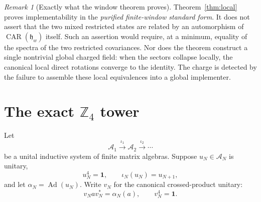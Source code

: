 \documentclass[11pt]{article}
\theoremstyle{remark}
\newtheorem{remark}[theorem]{Remark}
\newcommand{\CAR}{\operatorname{CAR}}
\newcommand{\id}{\mathbf 1}
\newcommand{\A}{\mathcal A}
\begin{document}
\begin{remark}[Exactly what the window theorem proves]
Theorem~\ref{thm:local} proves implementability in the
\emph{purified finite-window standard form}.  It does not assert that the
two mixed restricted states are related by an automorphism of
$\CAR(\mathfrak h_w)$ itself.  Such an assertion would require, at a
minimum, equality of the spectra of the two restricted covariances.
Nor does the theorem construct a single nontrivial global charged field:
when the sectors collapse locally, the canonical local direct rotations
converge to the identity.  The charge is detected by the failure to
assemble these local equivalences into a global implementer.
\end{remark}

\section{The exact \texorpdfstring{$\mathbb Z_4$}{Z4} tower}
\label{sec:tower}

Let
\[
 \A_1\xrightarrow{\iota_1}\A_2\xrightarrow{\iota_2}\cdots
\]
be a unital inductive system of finite matrix algebras.  Suppose
$u_N\in\A_N$ is unitary,
\[
 u_N^4=\id,\qquad \iota_N(u_N)=u_{N+1},
\tag{4.1}\label{eq:compatible-clock}
\]
and let $\alpha_N=\operatorname{Ad}(u_N)$.
Write $v_N$ for the canonical crossed-product unitary:
\[
 v_Nav_N^*=\alpha_N(a),\qquad v_N^4=\id.
\]
\end{document}
